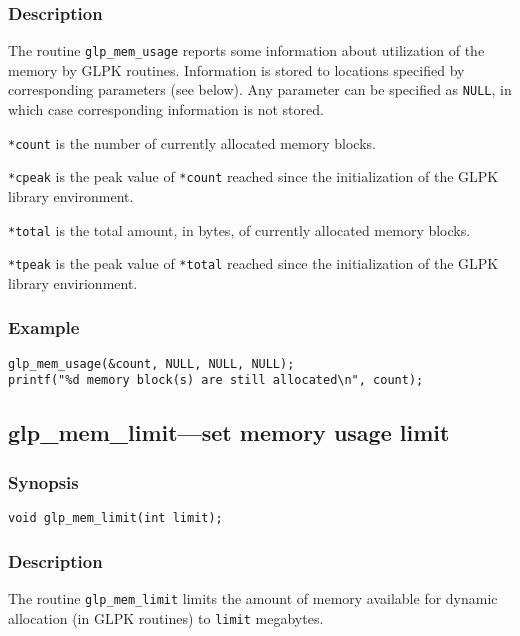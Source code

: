 \subsubsection*{Description}

The routine \verb|glp_mem_usage| reports some information about
utilization of the memory by GLPK routines. Information is stored to
locations specified by corresponding parameters (see below). Any
parameter can be specified as \verb|NULL|, in which case corresponding
information is not stored.

\verb|*count| is the number of currently allocated memory blocks.

\verb|*cpeak| is the peak value of \verb|*count| reached since the
initialization of the GLPK library environment.

\verb|*total| is the total amount, in bytes, of currently allocated
memory blocks.

\verb|*tpeak| is the peak value of \verb|*total| reached since the
initialization of the GLPK library envirionment.

\subsubsection*{Example}

\begin{verbatim}
glp_mem_usage(&count, NULL, NULL, NULL);
printf("%d memory block(s) are still allocated\n", count);
\end{verbatim}

\subsection{glp\_mem\_limit---set memory usage limit}

\subsubsection*{Synopsis}

\begin{verbatim}
void glp_mem_limit(int limit);
\end{verbatim}

\subsubsection*{Description}

The routine \verb|glp_mem_limit| limits the amount of memory available
for dynamic allocation (in GLPK routines) to \verb|limit| megabytes.

